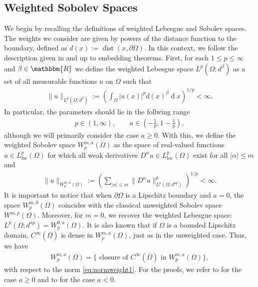 \documentclass[12pt,a4paper,twoside]{article}
\newcommand{\R}{\mathbbm {R}}
\newcommand{\diff}{\operatorname{d}\!}
\newcommand{\dist}{\operatorname{dist}}
\begin{document}
\subsection{Weighted Sobolev Spaces} \label{subsec:weightedsobspace}
We begin by recalling the definitions of weighted Lebesgue and Sobolev spaces. The weights we consider are given by powers of the distance function to the boundary, defined as $d(x):=\dist(x,\partial\Omega)$. In this context, we follow the description given in \cite{maz2011recent} and \cite{maz2010dirichlet} up to embedding theorems. First, for each $1 \le p\le \infty$ and $\beta\in\R$  we define the weighted Lebesgue space $L^p(\Omega; d^\beta)$ as a set of all measurable functions $u$ on $\Omega$ such that
\begin{align*}
    \|u\|_{L^p(\Omega;d^\beta)}:= \left(   
    \int_\Omega | u(x)|^p d(x)^{\beta} \diff x
    \right)^{1/p}<\infty.
\end{align*}
In particular, the parameters should lie in the follwing range
\begin{align}
    p\in(1,\infty), \qquad a\in \left(-\frac{1}{p}, 1- \frac{1}{p} \right), \label{eq:adef} %
\end{align}
although we will primarily consider the case $a\ge0$. With this, we define the weighted Sobolev space $W^{m,a}_p(\Omega)$ as the space of real-valued functions $u\in L^p_{\text{loc}}(\Omega)$ for which all weak derivatives $D^\alpha u\in L^p_{\text{loc}}(\Omega)$  exist for all $|\alpha|\le m$ and
\begin{align}
  \|u\|_{ W^{m,a}_p(\Omega)} :=\left(  \sum_{ |\alpha|\le m } 
    \|D^\alpha u \|^p_{L^p(\Omega; d^{ap})} 
    \right)^{1/p}<\infty. \label{eq:normweight1}
\end{align}
It is important to notice that when $\partial\Omega$ is a Lipschitz boundary and $a=0$, the space $W^{m,0}_p(\Omega)$ coincides with the classical unweighted Sobolev space $W^{m,p}(\Omega)$. Moreover, for $m=0$, we recover the weighted Lebesgue space: $L^p(\Omega; d^{ap}) = W^{0,a}_p(\Omega)$. It is also known that if $\Omega$ is a bounded Lipschitz domain, $C^\infty(\overline{\Omega})$ is dense in $W^{m,a}_p(\Omega)$, just as in the unweighted case. Thus, we have
\begin{align*}
    W^{m,a}_p(\Omega)= \big\{ \text{ closure of $C^\infty(\overline{\Omega})$ in } W^{m,a}_p(\Omega) \big\},
\end{align*}
with respect to the norm \eqref{eq:normweight1}. For the proofs, we refer to \cite[p.55 Theorem 7.2]{kufner1980weighted} for the case  $a\ge0$ and to \cite[p.119 Remarks 11.12 (iii)]{kufner1980weighted} for the case  $a<0$. 
\end{document}
